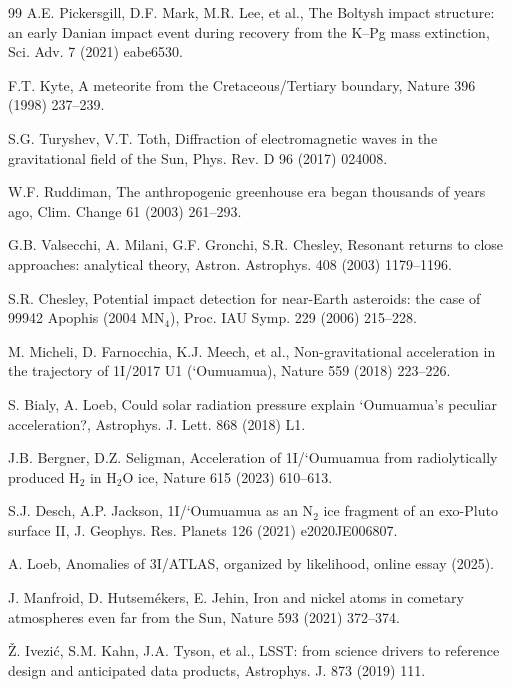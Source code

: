 \documentclass[preprint,12pt]{elsarticle}
\theoremstyle{definition}
\begin{document}
\begin{thebibliography}{99}
 A.E. Pickersgill, D.F. Mark, M.R. Lee, et al., The Boltysh impact structure: an early Danian impact event during recovery from the K--Pg mass extinction, Sci. Adv. 7 (2021) eabe6530. 

 F.T. Kyte, A meteorite from the Cretaceous/Tertiary boundary, Nature 396 (1998) 237--239.

 S.G. Turyshev, V.T. Toth, Diffraction of electromagnetic waves in the gravitational field of the Sun, Phys. Rev. D 96 (2017) 024008.

 W.F. Ruddiman, The anthropogenic greenhouse era began thousands of years ago, Clim. Change 61 (2003) 261--293.

 G.B. Valsecchi, A. Milani, G.F. Gronchi, S.R. Chesley, Resonant returns to close approaches: analytical theory, Astron. Astrophys. 408 (2003) 1179--1196.

 S.R. Chesley, Potential impact detection for near-Earth asteroids: the case of 99942 Apophis (2004 MN$_4$), Proc. IAU Symp. 229 (2006) 215--228. 

 M. Micheli, D. Farnocchia, K.J. Meech, et al., Non-gravitational acceleration in the trajectory of 1I/2017 U1 (`Oumuamua), Nature 559 (2018) 223--226.

 S. Bialy, A. Loeb, Could solar radiation pressure explain `Oumuamua's peculiar acceleration?, Astrophys. J. Lett. 868 (2018) L1.

 J.B. Bergner, D.Z. Seligman, Acceleration of 1I/`Oumuamua from radiolytically produced H$_2$ in H$_2$O ice, Nature 615 (2023) 610--613.

 S.J. Desch, A.P. Jackson, 1I/`Oumuamua as an N$_2$ ice fragment of an exo-Pluto surface II, J. Geophys. Res. Planets 126 (2021) e2020JE006807.

 A. Loeb, Anomalies of 3I/ATLAS, organized by likelihood, online essay (2025). %

 J. Manfroid, D. Hutsem\'ekers, E. Jehin, Iron and nickel atoms in cometary atmospheres even far from the Sun, Nature 593 (2021) 372--374.

 \v{Z}. Ivezi\'c, S.M. Kahn, J.A. Tyson, et al., LSST: from science drivers to reference design and anticipated data products, Astrophys. J. 873 (2019) 111.


\end{thebibliography}
\end{document}
